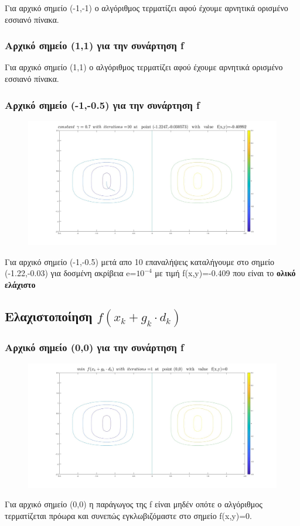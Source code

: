 \documentclass{article}
\begin{document}
Για αρχικό σημείο (-1,-1) ο αλγόριθμος τερματίζει αφού έχουμε αρνητικά ορισμένο εσσιανό πίνακα.
\clearpage
\subsubsection*{Αρχικό σημείο (1,1) για την συνάρτηση f}
 
Για αρχικό σημείο (1,1) ο αλγόριθμος τερματίζει αφού έχουμε αρνητικά ορισμένο εσσιανό πίνακα.
\subsubsection*{Αρχικό σημείο (-1,-0.5) για την συνάρτηση f}
\begin{figure}[h!]	
     \centering  
     \advance\leftskip-0.2cm  
  \includegraphics[width=140mm,scale=2]{n1a.jpg}
\end{figure} 
Για αρχικό σημείο (-1,-0.5) μετά απο 10 επαναλήψεις καταλήγουμε στο σημείο (-1.22,-0.03) για  δοσμένη ακρίβεια e=$10^{-4}$ με τιμή f(x,y)=-0.409 που είναι  το \textbf{ολικό ελάχιστο}
\clearpage
\subsection*{Ελαχιστοποίηση $f(x_k+g_k \cdot d_k )$}
 
\subsubsection*{Αρχικό σημείο (0,0) για την συνάρτηση f}
\begin{figure}[h!]	
     \centering  
     \advance\leftskip-0.2cm  
  \includegraphics[width=140mm,scale=2]{mfa.jpg}
\end{figure} 
Για αρχικό σημείο (0,0) η παράγωγος της f είναι μηδέν οπότε ο αλγόριθμος τερματίζεται πρόωρα και συνεπώς εγκλωβιζόμαστε στο σημείο f(x,y)=0.
\end{document}
